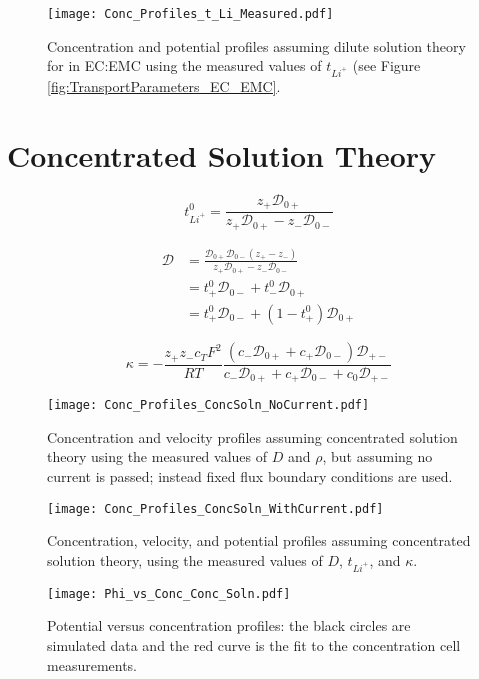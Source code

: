 \documentclass[12pt]{article}
\begin{document}
	\begin{figure}[h]
		\centering
		\texttt{[image: Conc\_Profiles\_t\_Li\_Measured.pdf]}
		\caption{Concentration and potential profiles assuming dilute solution theory for  in EC:EMC using the measured values of $t_{Li^+}$ (see Figure \ref{fig:TransportParameters_EC_EMC}.}
		\label{fig:Sim_MeasTransportParams_ECEMC}
	\end{figure}



	\clearpage
	\section{Concentrated Solution Theory}

	\begin{equation}
		t^0_{Li^+} = \frac{z_+ \mathscr{D}_{0+}}{z_+\mathscr{D}_{0+} - z_-\mathscr{D}_{0-}}
	\end{equation}

	\begin{align}
		\mathscr{D} &= \frac{\mathscr{D}_{0+}\mathscr{D}_{0-}(z_+ - z_-)}{z_+\mathscr{D}_{0+} - z_-\mathscr{D}_{0-}}
		\\
		&= t_+^0 \mathscr{D}_{0-} + t_-^0 \mathscr{D}_{0+}
		\\
		&= t_+^0 \mathscr{D}_{0-} + (1 - t_+^0) \mathscr{D}_{0+}
	\end{align}

	\begin{equation}
		\kappa = -\frac{z_+ z_- c_T F^2}{RT} \frac{(c_- \mathscr{D}_{0+} + c_+ \mathscr{D}_{0-}) \mathscr{D}_{+-}}{c_- \mathscr{D}_{0+} + c_+ \mathscr{D}_{0-} + c_0 \mathscr{D}_{+-}}
	\end{equation}

	\begin{figure}[h]
		\centering
		\texttt{[image: Conc\_Profiles\_ConcSoln\_NoCurrent.pdf]}
		\caption{Concentration and velocity profiles assuming concentrated solution theory using the measured values of $D$ and $\rho$, but assuming no current is passed; instead fixed flux boundary conditions are used.}
	\end{figure}

	\begin{figure}[h]
		\centering
		\texttt{[image: Conc\_Profiles\_ConcSoln\_WithCurrent.pdf]}
		\caption{Concentration, velocity, and potential profiles assuming concentrated solution theory, using the measured values of $D$, $t_{Li^+}$, and $\kappa$.}
	\end{figure}

	\begin{figure}[h]
		\centering
		\texttt{[image: Phi\_vs\_Conc\_Conc\_Soln.pdf]}
		\caption{Potential versus concentration profiles: the black circles are simulated data and the red curve is the fit to the concentration cell measurements.}
	\end{figure}
	
\end{document}
